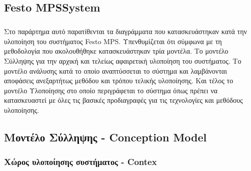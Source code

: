 \documentclass[a4paper,12pt,twoside]{report}
\begin{document}
\begin{appendices}
	\chapter{Festo MPS\textregistered System}
	\label{κεφ.:Παράρτημα Festo MPS System}
	
		\paragraph{} {Στο παράρτημα αυτό παρατίθενται τα διαγράμματα που κατασκευάστηκαν κατά την υλοποίηση του συστήματος Festo MPS\textregistered. Υπενθυμίζεται ότι σύμφωνα με τη μεθοδολογία που ακολουθήθηκε κατασκευάστηκαν τρία μοντέλα. Το μοντέλο Σύλληψης για την αρχική και τελείως αφαιρετική υλοποίηση του συστήματος. Το μοντέλο ανάλυσης κατά το οποίο αναπτύσσεται το σύστημα και λαμβάνονται αποφάσεις ανεξαρτήτως μεθόδου και τρόπου τελικής υλοποίησης. Και τέλος το μοντέλο Υλοποίησης στο οποίο περιγράφεται το σύστημα όπως πρέπει να κατασκευαστεί με όλες τις βασικές προδιαγραφές για τις τεχνολογίες και μεθόδους υλοποίησης.
		}
		\FloatBarrier
		\section{Μοντέλο Σύλληψης - Conception Model}
			
			\subsection{Χώρος υλοποίησης συστήματος - Contex}
			

\end{appendices}
\end{document}
